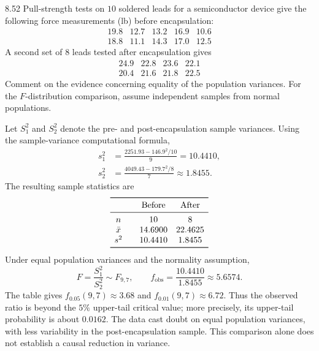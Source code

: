 \documentclass[11pt,oneside]{article}
\begin{document}
\begin{exercise}{8.52}
Pull-strength tests on $10$ soldered leads for a semiconductor device give the following force measurements (lb) before encapsulation:
\[
\begin{array}{rrrrr}
19.8&12.7&13.2&16.9&10.6\\
18.8&11.1&14.3&17.0&12.5
\end{array}
\]
A second set of $8$ leads tested after encapsulation gives
\[
\begin{array}{rrrr}
24.9&22.8&23.6&22.1\\
20.4&21.6&21.8&22.5
\end{array}
\]
Comment on the evidence concerning equality of the population variances. For the $F$-distribution comparison, assume independent samples from normal populations.
\end{exercise}
\begin{solution}
Let $S_1^2$ and $S_2^2$ denote the pre- and post-encapsulation sample variances. Using the sample-variance computational formula,
\[
\begin{aligned}
s_1^2&=\frac{2251.93-146.9^2/10}{9}=10.4410, \\
s_2^2&=\frac{4049.43-179.7^2/8}{7}\approx1.8455.
\end{aligned}
\]
The resulting sample statistics are
\[
\begin{array}{c@{\qquad}cc}\toprule
&\text{Before}&\text{After}\\\midrule
n&10&8\\
\bar x&14.6900&22.4625\\
s^2&10.4410&1.8455\\\bottomrule
\end{array}
\]
Under equal population variances and the normality assumption,
\[
F=\frac{S_1^2}{S_2^2}\sim F_{9, 7}, \qquad
f_{\mathrm{obs}}=\frac{10.4410}{1.8455}\approx5.6574.
\]
The table gives $f_{0.05}(9, 7)\approx3.68$ and $f_{0.01}(9, 7)\approx6.72$. Thus the observed ratio is beyond the $5\%$ upper-tail critical value; more precisely, its upper-tail probability is about $0.0162$. The data cast doubt on equal population variances, with less variability in the post-encapsulation sample. This comparison alone does not establish a causal reduction in variance.
\end{solution}
\end{document}
